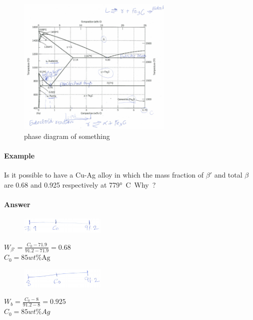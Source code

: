 \documentclass{article}
\begin{document}
\begin{enumerate}
\begin{itemize}
        \begin{figure}[H]
        	\centering
        	\includegraphics[width=0.66\textwidth]{assets/6d4f2ebd.png}
        	\caption{phase diagram of something}
        \end{figure}
    \end{itemize}
   
\end{enumerate}

\paragraph{Example} Is it possible to have a Cu-Ag alloy in which the mass fraction of $\beta\prime$ and total $\beta$ are 0.68 and 0.925 respectively at 779\si\degree C. Why?

\paragraph{Answer}

\begin{figure}[H]
	\centering
	\includegraphics[width=0.36\textwidth]{assets/03120a3b.png}
\end{figure}

$W_{\beta\prime} = \frac{C_0-71.9}{91.2-71.9} = 0.68$\\
$C_0 = 85 wt\% \text{Ag}$\\
\begin{figure}[h!]
	\centering
	\includegraphics[width=0.36\textwidth]{assets/e2dc5140.png}
\end{figure}
$W_b = \frac{C_0 - 8}{91.2-8} = 0.925$\\
$C_0 = 85wt\%{Ag}$
\end{document}

